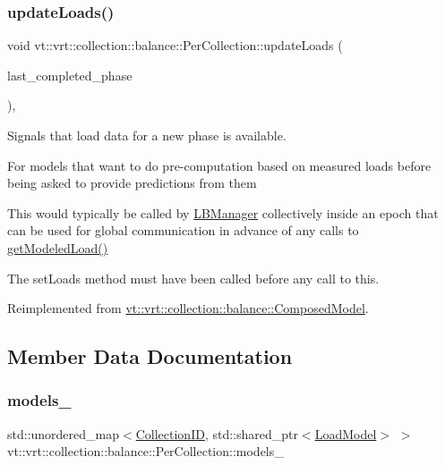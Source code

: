\subsubsection{\texorpdfstring{update\+Loads()}{updateLoads()}}
{\footnotesize\ttfamily void vt\+::vrt\+::collection\+::balance\+::\+Per\+Collection\+::update\+Loads (\begin{DoxyParamCaption}\item[{\hyperlink{namespacevt_a46ce6733d5cdbd735d561b7b4029f6d7}{Phase\+Type}}]{last\+\_\+completed\+\_\+phase }\end{DoxyParamCaption})\hspace{0.3cm}{\ttfamily [override]}, {\ttfamily [virtual]}}



Signals that load data for a new phase is available. 

For models that want to do pre-\/computation based on measured loads before being asked to provide predictions from them

This would typically be called by \hyperlink{structvt_1_1vrt_1_1collection_1_1balance_1_1_l_b_manager}{L\+B\+Manager} collectively inside an epoch that can be used for global communication in advance of any calls to \hyperlink{structvt_1_1vrt_1_1collection_1_1balance_1_1_per_collection_ad790d560d64515d28c6914f26fbe177c}{get\+Modeled\+Load()}

The {\ttfamily set\+Loads} method must have been called before any call to this. 

Reimplemented from \hyperlink{classvt_1_1vrt_1_1collection_1_1balance_1_1_composed_model_ad8108b4392d63b7f09e443920a64933a}{vt\+::vrt\+::collection\+::balance\+::\+Composed\+Model}.



\subsection{Member Data Documentation}
\mbox{\label{structvt_1_1vrt_1_1collection_1_1balance_1_1_per_collection_aec76660b4a44fe451a9546b4f4c50d3d}} 
\subsubsection{\texorpdfstring{models\+\_\+}{models\_}}
{\footnotesize\ttfamily std\+::unordered\+\_\+map$<$\hyperlink{structvt_1_1vrt_1_1collection_1_1balance_1_1_per_collection_ade08a6857f727a0a9d1ef63b25fc5b71}{Collection\+ID}, std\+::shared\+\_\+ptr$<$\hyperlink{structvt_1_1vrt_1_1collection_1_1balance_1_1_load_model}{Load\+Model}$>$ $>$ vt\+::vrt\+::collection\+::balance\+::\+Per\+Collection\+::models\+\_\+\hspace{0.3cm}{\ttfamily [private]}}



